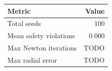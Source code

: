 \begin{tabular}{lr}
\hline
Metric & Value \\
\hline
Total seeds & 100 \\
Mean safety violations & 0.000 \\
Max Newton iterations & TODO \\
Max radial error & TODO \\
\hline
\end{tabular}
